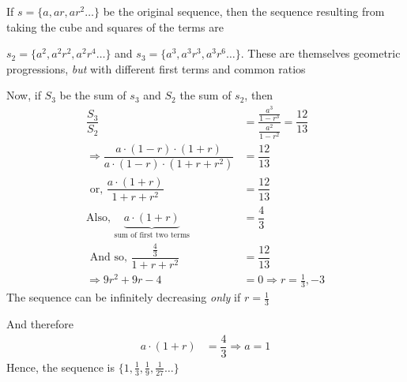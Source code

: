 \begin{solution}
   If $s = \lbrace a, ar, ar^2 \ldots\rbrace$ be the original sequence, then the sequence
   resulting from taking the cube and squares of the terms are
   
   $s_2 = \lbrace a^2, a^2r^2,a^2r^4 \ldots \rbrace$ and $ s_3 = \lbrace a^3, a^3r^3, a^3r^6 \ldots \rbrace$.
   These are themselves geometric progressions, \textit{but} with different first terms and common ratios
   
   Now, if $S_3$ be the sum of $s_3$ and $S_2$ the sum of $s_2$, then
   \begin{align}
   		\dfrac{S_3}{S_2} &= \dfrac{\frac{a^3}{1-r^3}}{\frac{a^2}{1-r^2}} = \dfrac{12}{13} \\
   		\Rightarrow \dfrac{a\cdot(1-r)\cdot(1+r)}{a\cdot(1-r)\cdot(1+r+r^2)} &= \dfrac{12}{13} \\
   		\text{ or, } \dfrac{a\cdot(1+r)}{1+r+r^2} &= \dfrac{12}{13} \\
   		\text{Also, } \underbrace{a\cdot(1+r)}_{\text{sum of first two terms}} &= \dfrac{4}{3} \\
   		\text{ And so, } \dfrac{\frac{4}{3}}{1+r+r^2} &= \dfrac{12}{13} \\
   		\Rightarrow 9r^2 + 9r - 4 &= 0 \Rightarrow r = \frac{1}{3}, -3
   \end{align}
   The sequence can be infinitely decreasing \textit{only} if $r = \frac{1}{3}$
   
   And therefore 
   \begin{align}
   	a\cdot(1+r) &= \dfrac{4}{3} \Rightarrow a = 1
   \end{align}
   Hence, the sequence is $\lbrace 1, \frac{1}{3}, \frac{1}{9}, \frac{1}{27} \ldots\rbrace$
\end{solution}

